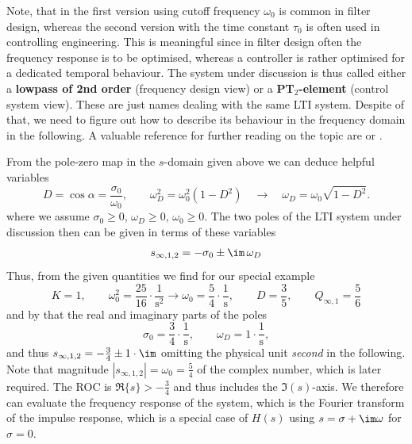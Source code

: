 \begin{mdframed}
Note, that in  the first version using cutoff frequency $\omega_0$ is
common in filter design, whereas the second version with the time
constant $\tau_0$ is often used in controlling engineering.
%
This is meaningful since in filter design often the frequency response is to be
optimised, whereas a controller is rather optimised for a dedicated
temporal behaviour.
%
The system under discussion is thus called either a \textbf{lowpass of 2nd order}
(frequency design view) or a \textbf{PT$_2$-element} (control system view).
These are just names dealing with the same LTI system.
Despite of that, we need to figure out how to describe its behaviour in the
frequency domain in the following.
A valuable reference for further reading on the topic are \cite[Chapter 6.5.2]{Oppenheim1997} or \cite[Chapter 4.3]{Fliege1991}.
%
%
%

From the pole-zero map in the $s$-domain given above
we can deduce helpful variables
\begin{equation}
D = \cos \alpha = \frac{\sigma_0}{\omega_0},\qquad
\omega_D^2 = \omega_0^2 (1-D^2) \quad \rightarrow \quad \omega_D = \omega_0
\sqrt{1-D^2}.
\end{equation}
where we assume $\sigma_0\geq 0$, $\omega_D\geq 0$, $\omega_0\geq 0$.
%
The two poles of the LTI system under discussion then can be given in terms of
these variables
\begin{align}
s_{\infty,1,2} = -\sigma_0 \pm \im\,\omega_D
\end{align}
%
Thus, from the given quantities we find for our special example
\begin{equation}
K=1, \qquad \omega_0^2 = \frac{25}{16} \cdot \frac{1}{\text{s}^2}
\rightarrow \omega_0 = \frac{5}{4} \cdot \frac{\text{1}}{\text{s}},
\qquad D = \frac{3}{5},\qquad
Q_{\infty,1} = \frac{5}{6}
\end{equation}
and by that the real and imaginary parts of the poles
\begin{equation}
\sigma_0 = \frac{3}{4}\cdot \frac{\text{1}}{\text{s}},\qquad
\omega_D = 1 \cdot \frac{\text{1}}{\text{s}},
\end{equation}
%
and thus $s_{\infty,1,2} = -\frac{3}{4} \pm 1\cdot\im$
omitting the physical unit \textit{second} in the following.
%
Note that magnitude $|s_{\infty,1,2}| = \omega_0=\frac{5}{4}$ of the complex number,
which is later required.
%
The ROC is $\Re\{s\}>-\frac{3}{4}$ and thus includes the $\Im(s)$-axis.
%
We therefore can evaluate the frequency response of the system, which is the
Fourier transform of the impulse response,
which is a special case of $H(s)$ using $s=\sigma+\im\omega$ for $\sigma=0$.
\end{mdframed}







